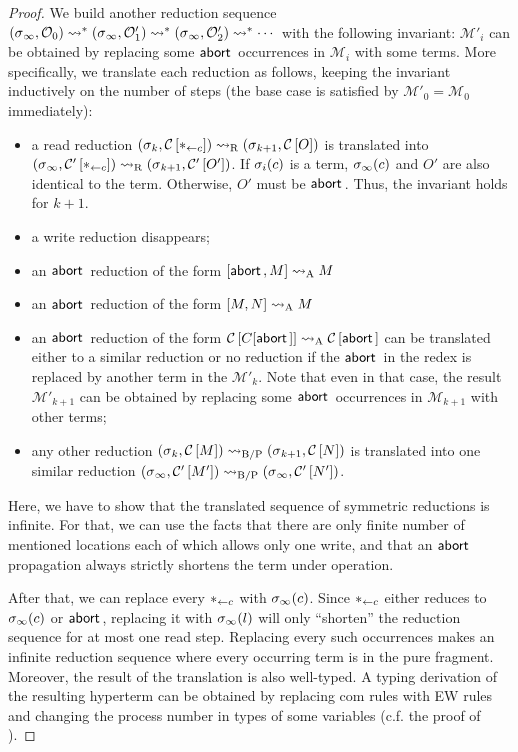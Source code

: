 {\begin{proof}
We build another reduction sequence
$
({\sigma}{_\infty},{\mathcal{O}_0})
\rightsquigarrow^\ast
({\sigma}{_\infty},{\mathcal{O}'_1})
\rightsquigarrow^\ast
({\sigma}{_\infty},{\mathcal{O}'_2})
\rightsquigarrow^\ast\cdots
$
with the following invariant:
$\mathcal M'_i$ can be obtained by replacing some $\mathsf{abort\,}$ occurrences
in $\mathcal M_i$ with some terms.
More specifically, we translate each reduction as follows, keeping the
invariant inductively on the number of steps
(the base case is satisfied by $\mathcal M'_0 = \mathcal M_0$ immediately):
\begin{itemize}
 \item a read reduction $({\sigma}{_k},{{\mathcal{C}}\left[{\ast_{\leftarrow{c}}}\right]})
       \rightsquigarrow_{\mathrm R}
       ({\sigma}{_{k+1}},{{\mathcal{C}}\left[{O}\right]})$ is translated into
       $({\sigma}{_\infty},{{\mathcal{C}'}\left[{\ast_{\leftarrow{c}}}\right]}) \rightsquigarrow_{\mathrm R}
       ({\sigma}{_{k+1}},{{\mathcal{C}'}\left[{O'}\right]})$.
       If ${\sigma}_i(c)$ is a term,
       ${\sigma}_\infty(c)$ and $O'$ are also identical to the term.
       Otherwise, $O'$ must be $\mathsf{abort\,}$.
       Thus, the invariant
       holds for $k+1$.
 \item a write reduction disappears;
 \item an $\mathsf{abort\,}$ reduction of the form $[{\mathsf{abort\,}, M}]\rightsquigarrow_{\mathrm A} M$ 
 \item an $\mathsf{abort\,}$ reduction of the form $[{M, N}]\rightsquigarrow_{\mathrm A} M$ 
 \item an $\mathsf{abort\,}$ reduction of the form
       ${\mathcal{C}}\left[{C[\mathsf{abort\,}]}\right] \rightsquigarrow_{\mathrm A} {\mathcal{C}}\left[{\mathsf{abort\,}}\right]$ can be translated
       either to a similar reduction or no reduction if the $\mathsf{abort\,}$ in
       the redex is replaced by another term in the $\mathcal{M'}_k$.
       Note that even in that case, the result $\mathcal{M'}_{k+1}$ can
       be obtained by replacing some $\mathsf{abort\,}$ occurrences in
       $\mathcal{M}_{k+1}$ with other terms;
 \item any other reduction $({\sigma}{_k},{{\mathcal{C}}\left[{M}\right]}) \rightsquigarrow_{\mathrm{B/P}}
       ({\sigma}{_{k+1}},{{\mathcal{C}}\left[{N}\right]})$
       is translated into one similar reduction
       $({\sigma}{_\infty},{{\mathcal{C}'}\left[{M'}\right]})\rightsquigarrow_{\mathrm{B/P}}
        ({\sigma}{_\infty},{{\mathcal{C}'}\left[{N'}\right]})$.
\end{itemize}
Here, we have to show that the translated sequence of symmetric
reductions is infinite.
For that, we can use the facts that there are only finite
number of mentioned locations each of which allows only one write,
 and that an $\mathsf{abort\,}$ propagation always
strictly shortens the term under operation.

 After that, we can replace
 every ${\ast_{\leftarrow{c}}}$ with
 ${\sigma}_\infty(c)$.
 Since $\ast_{\leftarrow{c}}$ either reduces to ${\sigma}_\infty(c)$ or $\mathsf{abort\,}$,
 replacing it with ${\sigma}_\infty(l)$ will only ``shorten'' the reduction
 sequence for at most one read step.
 Replacing every such occurrences
 makes an infinite reduction sequence where every occurring term is
 in the pure fragment.
 Moreover,
 the result of the translation is also well-typed.
 A typing derivation of the resulting hyperterm can be obtained by
 replacing com rules with EW rules and changing the process number in
 types of some variables (c.f. the proof of ).


\end{proof}}
